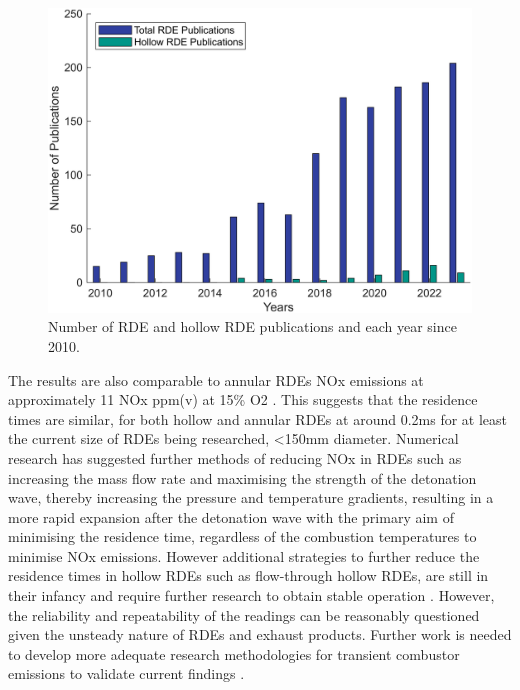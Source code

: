 \documentclass{article}
\begin{document}
\begin{figure}
\centering
\includegraphics[scale=0.75]{Hollow_RDE_Share.png}
\caption{Number of RDE and hollow RDE publications and each year since 2010.}\label{Fig.2}
\end{figure}


The results are also comparable to annular RDEs NOx emissions at approximately 11 NOx ppm(v) at 15\% O2 \cite{Ferguson2020}. This suggests that the residence times are similar, for both hollow and annular RDEs at around 0.2ms \cite{Anand2019} for at least the current size of RDEs being researched, <150mm diameter. Numerical research has suggested further methods of reducing NOx in RDEs such as increasing the mass flow rate and maximising the strength of the detonation wave, thereby increasing the pressure and temperature gradients, resulting in a more rapid expansion after the detonation wave with the primary aim of minimising the residence time, regardless of the combustion temperatures to minimise NOx emissions. However additional strategies to further reduce the residence times in hollow RDEs such as flow-through hollow RDEs, are still in their infancy and require further research to obtain stable operation \cite{Wiggins2023}. However, the reliability and repeatability of the readings can be reasonably questioned given the unsteady nature of RDEs and exhaust products. Further work is needed to develop more adequate research methodologies for transient combustor emissions to validate current findings \cite{Anand2019}.
\par
\end{document}
